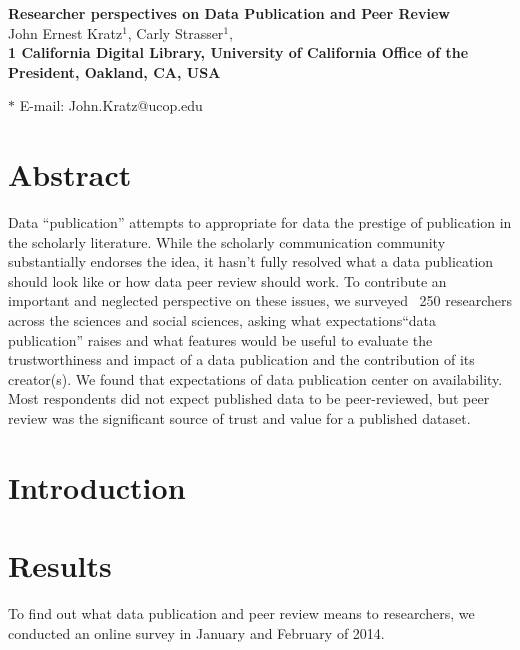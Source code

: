 \documentclass[10pt]{article}
\date{}
\begin{document}
\begin{flushleft}
{\Large
\textbf{Researcher perspectives on Data Publication and Peer Review}
}
\\
John Ernest Kratz$^{1}$, 
Carly Strasser$^{1}$, 
\\
\bf{1} California Digital Library, University of California Office of the President, Oakland, CA, USA

$\ast$ E-mail: John.Kratz@ucop.edu
\end{flushleft}

\section*{Abstract}

Data ``publication'' attempts to appropriate for data the prestige of publication in the scholarly literature. 
While the scholarly communication community substantially endorses the idea, it hasn't fully resolved what a data publication should look like or how data peer review should work. 
To contribute an important and neglected perspective on these issues, we surveyed ~250 researchers across the sciences and social sciences, asking what expectations``data publication'' raises and what features would be useful to evaluate the trustworthiness and impact of a data publication and the contribution of its creator(s).  
We found that expectations of data publication center on availability.
Most respondents did not expect published data to be peer-reviewed, but peer review was the significant source of trust and value for a published dataset.


\section*{Introduction}

\section*{Results}
To find out what data publication and peer review means to researchers, we conducted an online survey in January and February of 2014.
\end{document}
